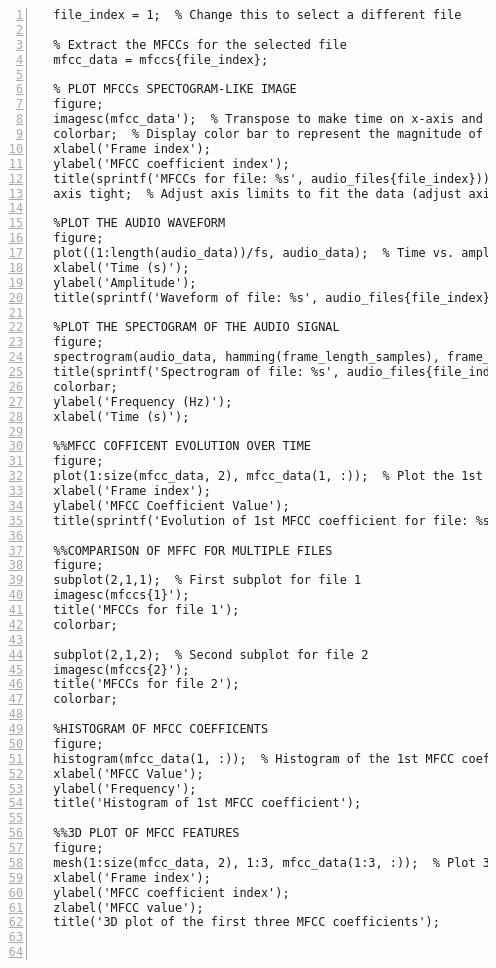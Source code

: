 \documentclass{article}
\begin{document}
\begin{lstlisting}[frame=single, numbers=left, style=Matlab-editor, caption={Develop\_Set\_Evaluation.mlx}, label={lst:Develop_Set_Evaluation}]
  % Choose the file you want to display the MFCC for
  file_index = 1;  % Change this to select a different file
  
  % Extract the MFCCs for the selected file
  mfcc_data = mfccs{file_index};
  
  % PLOT MFCCs SPECTOGRAM-LIKE IMAGE
  figure;
  imagesc(mfcc_data');  % Transpose to make time on x-axis and MFCC coefficients on y-axis
  colorbar;  % Display color bar to represent the magnitude of the MFCCs
  xlabel('Frame index');
  ylabel('MFCC coefficient index');
  title(sprintf('MFCCs for file: %s', audio_files{file_index}));
  axis tight;  % Adjust axis limits to fit the data (adjust axis for better readability)
  
  %PLOT THE AUDIO WAVEFORM
  figure;
  plot((1:length(audio_data))/fs, audio_data);  % Time vs. amplitude plot
  xlabel('Time (s)');
  ylabel('Amplitude');
  title(sprintf('Waveform of file: %s', audio_files{file_index}));
  
  %PLOT THE SPECTOGRAM OF THE AUDIO SIGNAL
  figure;
  spectrogram(audio_data, hamming(frame_length_samples), frame_length_samples - hop_size_samples, 1024, fs, 'yaxis');
  title(sprintf('Spectrogram of file: %s', audio_files{file_index}));
  colorbar;
  ylabel('Frequency (Hz)');
  xlabel('Time (s)');
  
  %%MFCC COFFICENT EVOLUTION OVER TIME
  figure;
  plot(1:size(mfcc_data, 2), mfcc_data(1, :));  % Plot the 1st MFCC coefficient over time
  xlabel('Frame index');
  ylabel('MFCC Coefficient Value');
  title(sprintf('Evolution of 1st MFCC coefficient for file: %s', audio_files{file_index}));
  
  %%COMPARISON OF MFFC FOR MULTIPLE FILES
  figure;
  subplot(2,1,1);  % First subplot for file 1
  imagesc(mfccs{1}');
  title('MFCCs for file 1');
  colorbar;
  
  subplot(2,1,2);  % Second subplot for file 2
  imagesc(mfccs{2}');
  title('MFCCs for file 2');
  colorbar;
  
  %HISTOGRAM OF MFCC COEFFICENTS
  figure;
  histogram(mfcc_data(1, :));  % Histogram of the 1st MFCC coefficient
  xlabel('MFCC Value');
  ylabel('Frequency');
  title('Histogram of 1st MFCC coefficient');
  
  %%3D PLOT OF MFCC FEATURES
  figure;
  mesh(1:size(mfcc_data, 2), 1:3, mfcc_data(1:3, :));  % Plot 3 first MFCC coefficients
  xlabel('Frame index');
  ylabel('MFCC coefficient index');
  zlabel('MFCC value');
  title('3D plot of the first three MFCC coefficients');
  
  
\end{lstlisting}
\end{document}
